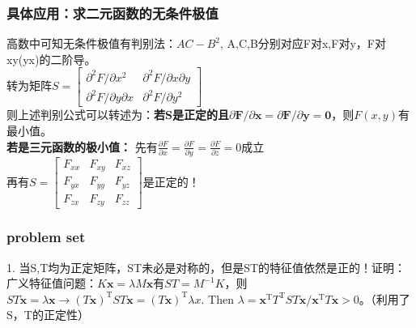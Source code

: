     \subsubsection{具体应用：求二元函数的无条件极值}
    高数中可知无条件极值有判别法：$AC-B^{2}$, A,C,B分别对应F对x,F对y，F对xy(yx)的二阶导。\\
    转为矩阵$S=\left[\begin{array}{ll}{\partial^{2} F / \partial x^{2}} & {\partial^{2} F / \partial x \partial y} \\ {\partial^{2} F / \partial y \partial x} & {\partial^{2} F / \partial y^{2}}\end{array}\right]$
    \\
    则上述判别公式可以转述为：\textbf{若S是正定的且$\partial \boldsymbol{F} / \partial \boldsymbol{x}=\partial \boldsymbol{F} / \partial \boldsymbol{y}=\mathbf{0}$}，则$F(x,y)$有最小值。
    \\
    \textbf{若是三元函数的极小值：}
    先有$\frac{\partial F}{\partial x}=\frac{\partial F}{\partial y}=\frac{\partial F}{\partial z}=0$成立\\
    再有$S=\left[\begin{array}{ccc}{F_{x x}} & {F_{x y}} & {F_{x z}} \\ {F_{y x}} & {F_{y y}} & {F_{y z}} \\ {F_{z x}} & {F_{z y}} & {F_{z z}}\end{array}\right]$是正定的！
    
    \subsubsection{problem set}
    1. 当S,T均为正定矩阵，ST未必是对称的，但是ST的特征值依然是正的！证明：广义特征值问题：$K \boldsymbol{x}=\lambda M \boldsymbol{x}$有$S T=M^{-1} K$，则$S T \boldsymbol{x}=\lambda \boldsymbol{x} \rightarrow (T \boldsymbol{x})^{\mathrm{T}} S T \boldsymbol{x}=(T \boldsymbol{x})^{\mathrm{T}} \lambda x .$ Then $\lambda=\boldsymbol{x}^{\mathrm{T}} T^{\mathrm{T}} S T \boldsymbol{x} / \boldsymbol{x}^{\mathrm{T}} T \boldsymbol{x}>0$。（利用了S，T的正定性）
    
